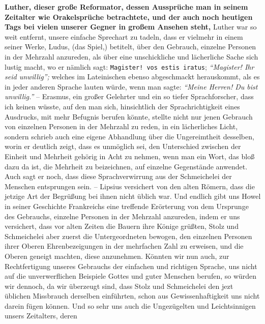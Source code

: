 \textbf{Luther, dieser große Reformator, dessen
Aussprüche man in seinem Zeitalter
wie Orakelsprüche betrachtete, und der auch noch heutigen Tags bei vielen
unserer Gegner in großem Ansehen steht,} Luther
war so weit entfernt, unsere
einfache Sprechart zu tadeln, dass er vielmehr in einem seiner Werke,
Ludus, (das
Spiel,) betitelt, über den Gebrauch, einzelne Personen in der Mehrzahl
anzureden, als über eine unschickliche und lächerliche Sache sich lustig macht,
wo er nämlich sagt: \texttt{Magister! vos estis iratus}; \textit{"`Magister! Ihr
seid
unwillig"';} welches im Lateinischen ebenso abgeschmackt
herauskommt, als es in
jeder anderen Sprache lauten würde, wenn man sagte:
\textit{"`Meine Herren! Du bist unwillig."'} --
Erasmus, ein großer Gelehrter und ein so tiefer
Sprachforscher,
dass ich keinen wüsste, auf den man sich, hinsichtlich der Sprachrichtigkeit
eines
Ausdrucks, mit mehr Befugnis berufen könnte, stellte nicht nur jenen Gebrauch
von einzelnen Personen in der Mehrzahl zu reden, in ein lächerliches Licht,
sondern schrieb auch eine eigene Abhandlung über die Ungereimtheit desselben,
worin er deutlich zeigt, dass es unmöglich sei, den Unterschied zwischen der
Einheit und Mehrheit gehörig in Acht zu nehmen, wenn man ein Wort, das bloß dazu
da ist, die Mehrheit zu beizeichnen, auf einzelne Gegenstände anwendet. Auch
sagt er noch, dass diese Sprachverwirrung aus der Schmeichelei der Menschen
entsprungen sein. -- Lipsius versichert von den alten
Römern, dass die jetzige Art
der Begrüßung bei ihnen nicht üblich war. Und endlich gibt uns
Howel in seiner
Geschichte Frankreichs eine treffende Erörterung von dem Ursprunge des
Gebrauchs, einzelne Personen in der Mehrzahl anzureden, indem er uns versichert,
dass vor alten Zeiten die Bauern ihre
Könige grüßten, Stolz und Schmeichelei aber
zuerst die Untergeordneten bewogen, den einzelnen Personen ihrer Oberen
Ehrenbezeigungen in der mehrfachen Zahl zu erweisen, und die Oberen geneigt
machten, diese anzunehmen. Könnten wir nun auch, zur Rechtfertigung unseres
Gebrauchs der einfachen und richtigen Sprache, uns nicht auf die unverwerflichen
Beispiele Gottes und guter Menschen berufen, so würden wir dennoch, da wir
überzeugt sind, dass Stolz und Schmeichelei den jezt üblichen Missbrauch
derselben
einführten, schon aus Gewissenhaftigkeit uns nicht darein fügen können. Und so
sehr uns auch die Ungezügelten und Leichtsinnigen unsers Zeitalters, deren
